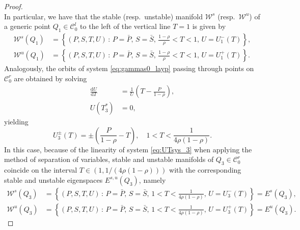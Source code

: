 \documentclass[a4paper,10pt,abstract=true,parskip=true]{scrartcl}
\theoremstyle{remark}
\numberwithin{equation}{section}
\numberwithin{thm}{section}
\begin{document}
\begin{proof}
\begin{equation}
\end{equation}
In particular, we have that the stable (resp.~unstable) manifold $\mathcal{W}^{s}$ (resp.~$\mathcal{W}^{u}$) of a generic point $Q_1 \in \mathcal{C}_0^l$ to the left of the vertical line $T=1$ is given by
\begin{equation}
\begin{aligned}
    \mathcal{W}^{s} (Q_1) &= \left\{ (P, S, T, U) \, : \, P=\bar{P}, \, S=\bar{S},\, \frac{1-\rho}{\rho}<T<1, \,  U=U_1^-(T)  \right\}, \\
    \mathcal{W}^{u} (Q_1) &= \left\{ (P, S, T, U) \, : \, P=\bar{P}, \, S=\bar{S},\, \frac{1-\rho}{\rho}<T<1, \,  U=U_1^+(T)  \right\}.
\end{aligned}
\end{equation}
Analogously, the orbits of system \eqref{eq:gammas0_layp} passing through points on $\mathcal{C}_0^r$ are obtained by solving
\begin{equation} \label{eq:UTsys_3}
\begin{aligned}
    \frac{\text{d}U}{\text{d}T} &= \frac{1}{U} \left(T - \frac{P}{1 - \rho} \right), \\
    U(T_3^\ast) &= 0,
\end{aligned}
\end{equation}
yielding
\begin{equation}
    U_3^\pm (T) = \pm \left(\frac{P}{1-\rho } - T \right),\quad 1 < T < \frac{1}{4 \rho  (1-\rho )}.
\end{equation}
In this case, because of the linearity of system \eqref{eq:UTsys_3} when applying the method of separation of variables, stable and unstable manifolds of $Q_3 \in \mathcal{C}_0^r$ coincide on the interval $T \in \left(1, 1/(4 \rho  (1-\rho ))\right)$ with the corresponding stable and unstable eigenspaces $E^{s,u}(Q_3)$, namely
\begin{equation}
\begin{aligned}
    \mathcal{W}^{s} (Q_3) &= \left\{ (P, S, T, U) \, : \, P=\bar{P}, \, S=\bar{S},\, 1<T<\frac{1}{4 \rho  (1-\rho )}, \,  U=U_3^-(T)  \right\} = E^{s} (Q_3), \\
    \mathcal{W}^{u} (Q_3) &= \left\{ (P, S, T, U) \, : \, P=\bar{P}, \, S=\bar{S},\, 1<T<\frac{1}{4 \rho  (1-\rho )}, \,  U=U_3^+(T)  \right\} = E^{u} (Q_3).
\end{aligned}
\end{equation}

\end{proof}
\end{document}
